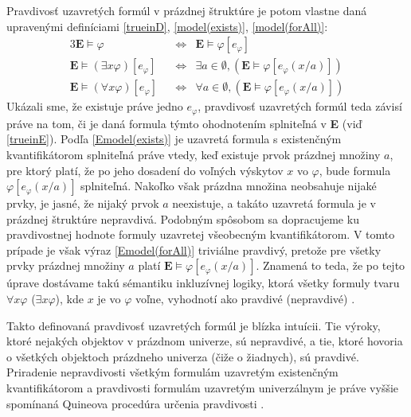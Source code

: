 \documentclass[12pt, letterpaper]{article}
\begin{document}

Pravdivosť uzavretých formúl v prázdnej štruktúre je potom vlastne daná upravenými definíciami \ref{trueinD}, \ref{model(exists)}, \ref{model(forAll)}:
\begin{alignat}{3}
	\mathbf{E} \models\varphi &&\iff& \mathbf{E}\models\varphi[e_\varphi] \label{trueinE} \\
	\mathbf{E} \models (\exists x\varphi)[e_\varphi] &&\iff& \exists a \in \emptyset, (\mathbf{E} \models \varphi[e_\varphi(x/a)]) \label{Emodel(exists)} \\
	\mathbf{E} \models (\forall x\varphi)[e_\varphi] &&\iff& \forall a \in \emptyset, (\mathbf{E} \models \varphi[e_\varphi(x/a)])	\label{Emodel(forAll)}
\end{alignat}
Ukázali sme, že existuje práve jedno $e_\varphi$, pravdivosť uzavretých formúl teda závisí práve na tom, či je daná formula týmto ohodnotením splniteľná v \textbf{E} (viď \ref{trueinE}). Podľa \ref{Emodel(exists)} je uzavretá formula s existenčným kvantifikátorom splniteľná práve vtedy, keď existuje prvok prázdnej množiny $a$, pre ktorý platí, že po jeho dosadení do voľných výskytov $x$ vo $\varphi$, bude formula $\varphi[e_\varphi(x/a)]$ splniteľná. Nakoľko však prázdna množina neobsahuje nijaké prvky, je jasné, že nijaký prvok $a$ neexistuje, a takáto uzavretá formula je v prázdnej štruktúre nepravdivá. Podobným spôsobom sa dopracujeme ku pravdivostnej hodnote formuly uzavretej všeobecným kvantifikátorom. V tomto prípade je však výraz \ref{Emodel(forAll)} triviálne pravdivý, pretože pre všetky prvky prázdnej množiny $a$ platí $\mathbf{E} \models \varphi[e_\varphi(x/a)]$. Znamená to teda, že po tejto úprave dostávame takú sémantiku inkluzívnej logiky, ktorá všetky formuly tvaru $\forall x \varphi$ ($\exists x \varphi$), kde $x$ je vo $\varphi$ voľne, vyhodnotí ako pravdivé (nepravdivé) \parencites[141--142]{mendelson_introduction_2015}[177]{quine_quantification_1954}[5]{williamson_note_1999}.\par 
Takto definovaná pravdivosť uzavretých formúl je blízka intuícii. Tie výroky, ktoré  nejakých objektov v prázdnom univerze, sú nepravdivé, a tie, ktoré hovoria o všetkých objektoch prázdneho univerza (čiže o žiadnych), sú pravdivé. Priradenie nepravdivosti všetkým formulám uzavretým existenčným kvantifikátorom a pravdivosti formulám uzavretým univerzálnym je práve vyššie spomínaná Quineova procedúra určenia pravdivosti \parencites[177]{quine_quantification_1954}[161]{QuineLPV}.\par
\end{document}
